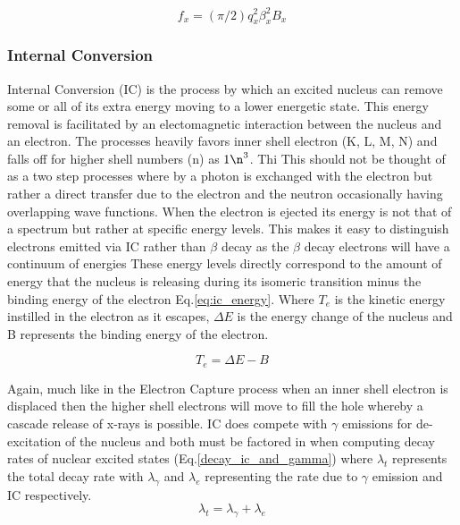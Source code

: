 \documentclass[jon_ringuette_thesis.tex]{subfiles}
\begin{document}
    \begin{equation}
        f_x = (\pi/2)q_x^2 \beta_x^2 B_x
        \label{eq:electron_capture_rate_fx}
    \end{equation}

    \subsubsection{Internal Conversion}
    Internal Conversion (IC) is the process by which an excited nucleus can remove some or all of its extra energy moving to a lower energetic state.  This energy removal is facilitated by an electomagnetic interaction between the nucleus and an electron.  The processes heavily favors inner shell electron (K, L, M, N) and falls off for higher shell numbers (n) as $1\n^3$.  Thi This should not be thought of as a two step processes where by a photon is exchanged with the electron but rather a direct transfer due to the electron and the neutron occasionally having overlapping wave functions.  When the electron is ejected its energy is not that of a spectrum but rather at specific energy levels.  This makes it easy to distinguish electrons emitted via IC rather than $\beta$ decay as the $\beta$ decay electrons will have a continuum of energies These energy levels directly correspond to the amount of energy that the nucleus is releasing during its isomeric transition minus the binding energy of the electron Eq.\ref{eq:ic_energy}.  Where $T_e$ is the kinetic energy instilled in the electron as it escapes, $\Delta E$ is the energy change of the nucleus and B represents the binding energy of the electron.

    \begin{equation}
        T_e = \Delta E -B
        \label{eq:ic_energy}
    \end{equation}

    Again, much like in the Electron Capture process when an inner shell electron is displaced then the higher shell electrons will move to fill the hole whereby a cascade release of x-rays is possible.  IC does compete with $\gamma$ emissions for de-excitation of the nucleus and both must be factored in when computing decay rates of nuclear excited states (Eq.\ref{decay_ic_and_gamma}) where $\lambda_t$ represents the total decay rate with $\lambda_{\gamma}$ and $\lambda_e$ representing the rate due to $\gamma$ emission and IC respectively.
    \begin{equation}
        \lambda_t = \lambda_{\gamma} + \lambda_e
        \label{eq:decay_ic_and_gamma}
    \end{equation}
\end{document}
